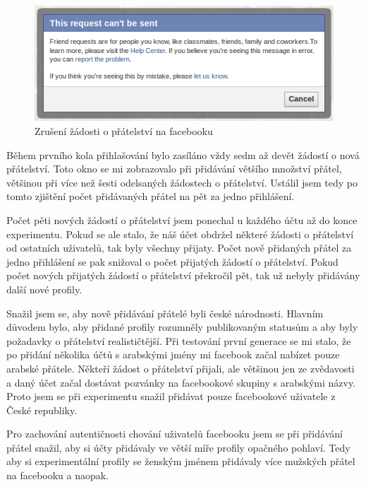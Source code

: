 \documentclass[thesis=M,czech]{FITthesis}[2013/05/10]
\begin{document}
\begin{figure}[h]
\begin{center}
\includegraphics[width=5in]{figures/cantFriend.png}
\caption{Zrušení žádosti o přátelství na facebooku}
\label{fig:cantFriend}
\end{center}
\end{figure}

Během prvního kola přihlašování bylo zasíláno vždy sedm až devět žádostí o nová přátelství. Toto okno se mi zobrazovalo při přidávání většího množství přátel, většinou při více než šesti odelsaných žádostech o přátelství. Ustálil jsem tedy po  tomto zjištění počet přidávaných přátel na pět za jedno přihlášení.

Počet pěti nových žádostí o přátelství jsem ponechal u každého účtu až do konce experimentu. Pokud se ale stalo, že náš účet obdržel některé žádosti o přátelství od ostatních uživatelů, tak byly všechny přijaty. Počet nově přidaných přátel za jedno přihlášení se pak snižoval o počet přijatých žádostí o přátelství. Pokud počet nových přijatých žádostí o přátelství překročil pět, tak už nebyly přidávány další nové profily.

Snažil jsem se, aby nově přidávání přátelé byli české národnosti. Hlavním důvodem bylo, aby přidané profily rozumněly publikovaným statusům a aby byly požadavky o přátelství realističtější. Při testování první generace se mi stalo, že po přidání několika účtů s arabskými jmény mi facebook začal nabízet pouze arabské přátele. Někteří žádost o přátelství přijali, ale většinou jen ze zvědavosti a daný účet začal dostávat pozvánky na facebookové skupiny s arabskými názvy. Proto jsem se při experimentu snažil přidávat pouze facebookové uživatele z České republiky.

Pro zachování autentičnosti chování uživatelů facebooku jsem se při přidávání přátel snažil, aby si účty přidávaly ve větší míře profily opačného pohlaví. Tedy aby si experimentální profily se ženským jménem přidávaly více mužských přátel na facebooku a naopak. 
\end{document}
